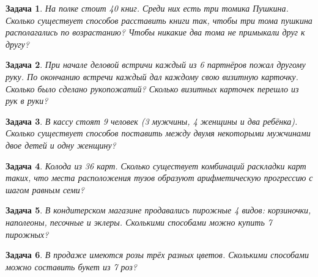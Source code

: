 \documentclass[12pt, a4paper]{article}
\newtheorem{problem}{Задача}
\begin{document}
\begin{problem}
На полке стоит 40 книг. Среди них есть три томика Пушкина. Сколько существует способов расставить книги так, чтобы три тома пушкина располагались по возрастанию? Чтобы никакие два тома не примыкали друг к другу?
\begin{sol}

\end{sol}
\end{problem}



\begin{problem}
При начале деловой встричи каждый из 6 партнёров пожал другому руку. По окончанию встречи каждый дал каждому свою визитную карточку. Сколько было сделано рукопожатий? Сколько визитных карточек перешло из рук в руки?
\begin{sol}

\end{sol}
\end{problem}



\begin{problem}
В кассу стоят 9 человек (3 мужчины, 4 женщины и два ребёнка). Сколько существует способов поставить между двумя некоторыми мужчинами двое детей и одну женщину?
\begin{sol}

\end{sol}
\end{problem}


\begin{problem}
Колода из 36 карт. Сколько существует комбинаций раскладки карт таких, что места расположения тузов образуют арифметическую прогрессию с шагом равным семи?
\begin{sol}

\end{sol}
\end{problem}



\begin{problem}
В кондитерском магазине продавались пирожные 4 видов: корзиночки, наполеоны, песочные и эклеры. Сколькими способами можно купить 7 пирожных?
\begin{sol}

\end{sol}
\end{problem}


\begin{problem}
В продаже имеются розы трёх разных цветов. Сколькими способами можно составить букет из 7 роз? 
\begin{sol}

\end{sol}
\end{problem}
\end{document}
